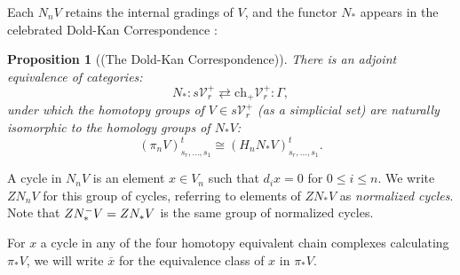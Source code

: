 \documentclass[11pt]{amsart} \renewcommand{\baselinestretch}{1.2}
\theoremstyle{plain}
\newtheorem{prop}[thm]{Proposition}
\numberwithin{equation}{section} %
\theoremstyle{plain}
\newtheorem{prop}[thm]{Proposition}
\numberwithin{equation}{chapter} %
\newcommand{\calV}{\mathcal{V}}
\newcommand{\citeBOX}[2][]{\cite[\mbox{#1}]{#2}}
\newcommand{\vect}[2]{\calV^{#1}_{#2}}
\newcommand{\Nop}{N^{\smash{-}}}
\newcommand{\complexes}{\mathrm{ch}_+}
\begin{document}
\begin{Conventions and notation}
Each $N_nV$ retains the internal gradings of $V$, and the functor $N_*$ appears in the celebrated  Dold-Kan Correspondence {\citeBOX[\S III.2]{goerss-jardine.pdf}}:
\begin{prop}[(The Dold-Kan Correspondence)]
There is an adjoint equivalence of categories:
\[N_*:s\vect{+}{r}\rightleftarrows \complexes \vect{+}{r}:\Gamma,\]
under which the homotopy groups of $V\in s\vect{+}{r}$ (as a simplicial set)  are naturally isomorphic to the homology groups of $N_*V$:
\[(\pi_n V)_{s_r,\ldots,s_1}^t\cong (H_n N_*V)_{s_r,\ldots,s_1}^t.\]
\end{prop}


%
A cycle in $N_nV$ is an element $x\in V_n$ such that $d_ix=0$ for $0\leq i\leq n$. We write $ZN_nV$ for this group of cycles, referring to elements of $ZN_*V$ as \emph{normalized cycles}. Note that $Z\Nop_*V=ZN_*V$ is the same group of normalized cycles.

For $x$ a cycle in any of the four homotopy equivalent chain complexes calculating $\pi_*V$, we will write $\overline{x}$ for the equivalence class of $x$ in $\pi_*V$.


\end{Conventions and notation}
\end{document}
